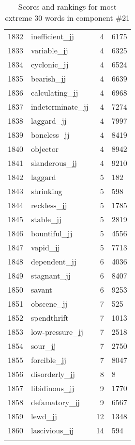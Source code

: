 \begin{longtable}[!htbp]{| rlr@{.}l |}
    1832 & inefficient\_jj & 4 & 6175 \\
    1833 & variable\_jj & 4 & 6325 \\
    1834 & cyclonic\_jj & 4 & 6524 \\
    1835 & bearish\_jj & 4 & 6639 \\
    1836 & calculating\_jj & 4 & 6968 \\
    1837 & indeterminate\_jj & 4 & 7274 \\
    1838 & laggard\_jj & 4 & 7997 \\
    1839 & boneless\_jj & 4 & 8419 \\
    1840 & objector & 4 & 8942 \\
    1841 & slanderous\_jj & 4 & 9210 \\
    1842 & laggard & 5 & 182 \\
    1843 & shrinking & 5 & 598 \\
    1844 & reckless\_jj & 5 & 1785 \\
    1845 & stable\_jj & 5 & 2819 \\
    1846 & bountiful\_jj & 5 & 4556 \\
    1847 & vapid\_jj & 5 & 7713 \\
    1848 & dependent\_jj & 6 & 4036 \\
    1849 & stagnant\_jj & 6 & 8407 \\
    1850 & savant & 6 & 9253 \\
    1851 & obscene\_jj & 7 & 525 \\
    1852 & spendthrift & 7 & 1013 \\
    1853 & low-pressure\_jj & 7 & 2518 \\
    1854 & sour\_jj & 7 & 2750 \\
    1855 & forcible\_jj & 7 & 8047 \\
    1856 & disorderly\_jj & 8 & 8 \\
    1857 & libidinous\_jj & 9 & 1770 \\
    1858 & defamatory\_jj & 9 & 6567 \\
    1859 & lewd\_jj & 12 & 1348 \\
    1860 & lascivious\_jj & 14 & 594 \\
    \hline
    \caption{Scores and rankings for most extreme 30 words in component \#21} \\
\end{longtable}
